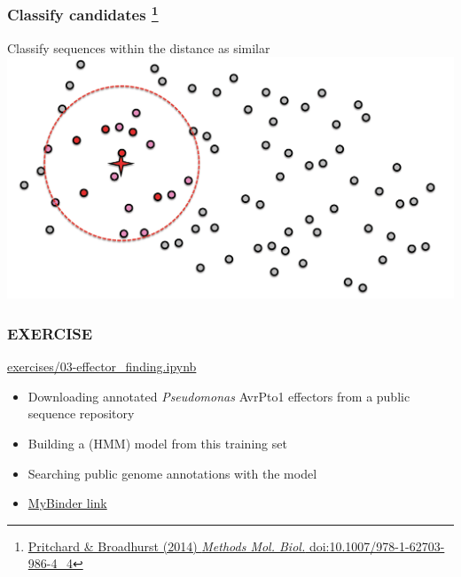 \begin{frame}
  \frametitle{Classify candidates
  \footnote{\tiny{\href{http://dx.doi.org/10.1007/978-1-62703-986-4_4}{Pritchard \& Broadhurst (2014) \textit{Methods Mol. Biol.} doi:10.1007/978-1-62703-986-4\_4}}}
}
  Classify sequences \textcolor{hutton_green}{within the distance} as \textcolor{hutton_blue}{similar} \vspace{0.5cm}
  \includegraphics[width=1\textwidth,valign=b]{images/finding_effectors3}    
\end{frame}

\begin{frame}
  \frametitle{EXERCISE}
  \begin{alertblock}{\url{exercises/03-effector_finding.ipynb}}
    \begin{itemize}
      \item Downloading annotated \textit{Pseudomonas} AvrPto1 effectors from a public sequence repository
      \item Building a (HMM) model from this training set
      \item Searching public genome annotations with the model
    \end{itemize}
  \end{alertblock}
  \begin{itemize}
    \item \textcolor{hutton_purple}{\href{http://mybinder.org/repo/widdowquinn/Teaching-EMBL-Plant-Path-Genomics}{MyBinder link}}
  \end{itemize}
\end{frame}

